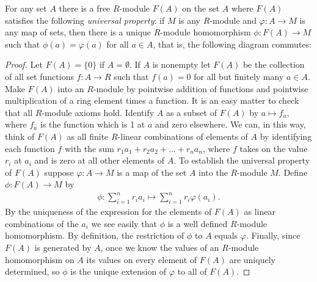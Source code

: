     \begin{theorem}\label{thm:universal-property}
        For any set $A$ there is a free $R$-module $F(A)$ on the set $A$ where $F(A)$ satisfies the following \textit{universal property}: if $M$ is any $R$-module and $\varphi:A \rightarrow M$ is any map of sets, then there is a unique $R$-module homomorphism $\phi:F(A) \rightarrow M$ such that $\phi(a) = \varphi(a)$ for all $a \in A$, that is, the following diagram commutes:
        \begin{center}
        \end{center}
    \end{theorem}
    \begin{proof}
        Let $F(A)=\{0\}$ if $A = \emptyset$. If $A$ is nonempty let $F(A)$ be the collection of all set functions $f:A \rightarrow R$ such that $f(a) = 0$ for all but finitely many $a \in A$. Make $F(A)$ into an $R$-module by pointwise addition of functions and pointwise multiplication of a ring element times a function. It is an easy matter to check that all $R$-module axioms hold. Identify $A$ as a subset of $F(A)$ by $a \mapsto f_a$, where $f_a$ is the function which is 1 at $a$ and zero elsewhere. We can, in this way, think of $F(A)$ as all finite $R$-linear combinations of elements of $A$ by identifying each function $f$ with the sum $r_1 a_1 + r_2 a_2 + ... + r_n a_n$, where $f$ takes on the value $r_i$ at $a_i$ and is zero at all other elements of $A$. To establish the universal property of $F(A)$ suppose $\varphi:A \rightarrow M$ is a map of the set $A$ into the $R$-module $M$. Define $\phi:F(A) \rightarrow M$ by
            \begin{equation*}
            \begin{split}
                \phi:\sum_{i=1}^{n}r_i a_i \mapsto \sum_{i=1}^{n}r_i \varphi(a_i).
            \end{split}
            \end{equation*}
        By the uniqueness of the expression for the elements of $F(A)$ as linear combinations of the $a_i$ we see easily that $\phi$ is a well defined $R$-module homomorphism. By definition, the restriction of $\phi$ to $A$ equals $\varphi$. Finally, since $F(A)$ is generated by $A$, once we know the values of an $R$-module homomorphism on $A$ its values on every element of $F(A)$ are uniquely determined, so $\phi$ is the unique extension of $\varphi$ to all of $F(A)$.
    \end{proof}

